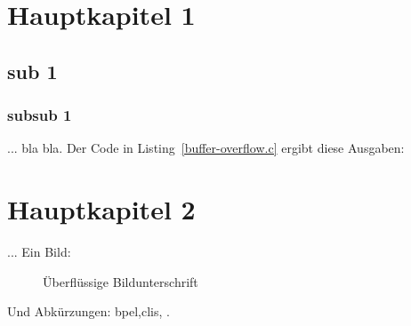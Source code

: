 \section{Hauptkapitel 1}
\subsection{sub 1}
\subsubsection{subsub 1}
... bla bla. Der Code in Listing~\ref{buffer-overflow.c} ergibt diese Ausgaben:

\section{Hauptkapitel 2}
... Ein Bild:

\begin{figure}[h]
  \caption{Überflüssige Bildunterschrift}\label{img-sample}
\end{figure}

Und Abkürzungen: \gls{bpel},\glspl{cli}, .
